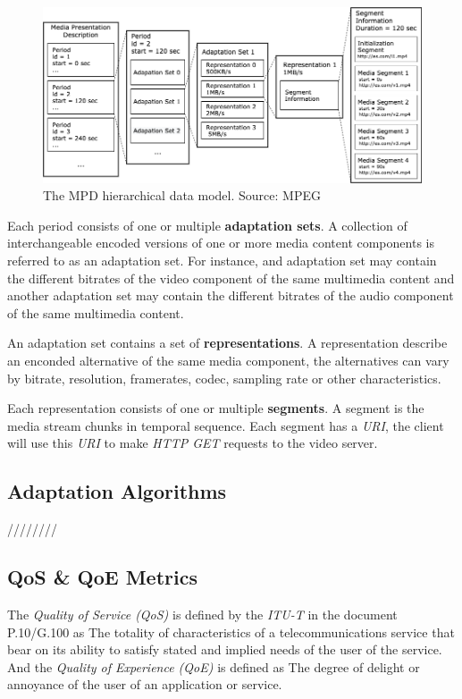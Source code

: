 \begin{figure}[h]
  \centering
  \includegraphics[width=\textwidth]{img/mpd.png}
  \caption{The MPD hierarchical data model. Source: MPEG \cite{ios1}}
  \label{fig:mpd}
\end{figure}

Each period consists of one or multiple \textbf{adaptation sets}. A collection of interchangeable 
encoded versions of one or more media content components is referred to as an adaptation set. For instance,
and adaptation set may contain the different bitrates of the video component of the same multimedia content
and another adaptation set may contain the different bitrates of the audio component of the same multimedia
content.

An adaptation set contains a set of \textbf{representations}. A representation describe an enconded
alternative of the same media component, the alternatives can vary by bitrate, resolution, framerates, 
codec, sampling rate or other characteristics.

Each representation consists of one or multiple \textbf{segments}. A segment is the media stream chunks
in temporal sequence. Each segment has a \textit{URI}, the client will use this \textit{URI} to make
\textit{HTTP GET} requests to the video server. 


\subsection{Adaptation Algorithms}
\label{sec:adap}

////////

\subsection{QoS \& QoE Metrics}
\label{sec:qoemetrics}


The \textit{Quality of Service (QoS)} is defined by the \textit{ITU-T} in the document P.10/G.100
 \cite{itu2} as \textquotedbl The totality of characteristics of a telecommunications service that bear on its 
 ability to satisfy stated and implied needs of the user of the service\textquotedbl. And the \textit{Quality of 
Experience (QoE)} is defined as \textquotedbl The degree of delight or annoyance of the user of an application or service\textquotedbl.

